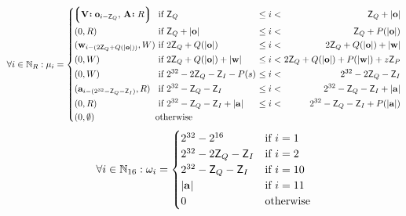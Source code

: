 \begin{equation}\label{eq:memlayout}
  \forall i \in \N_R : \mem_i = \left\{\begin{alignedat}{5}
    &\tup{\is{\mathbf{V}}{\mathbf{o}_{i - \mathsf{Z}_Q}}\ts\is{\mathbf{A}}{R}} &&\ \when
        \mathsf{Z}_Q
            &\ \leq i < \ &&
                \mathsf{Z}_Q + |\mathbf{o}|\\
    &(0, R) &&\ \when
        \mathsf{Z}_Q + |\mathbf{o}|
            &\ \leq i < \ &&
                \mathsf{Z}_Q + \rnp{|\mathbf{o}|} \\
    &(\mathbf{w}_{i - (2\mathsf{Z}_Q + \rnq{|\mathbf{o}|})}, W) &&\ \when
        2\mathsf{Z}_Q + \rnq{|\mathbf{o}|}
            &\ \leq i < \ &&
                2\mathsf{Z}_Q + \rnq{|\mathbf{o}|} + |\mathbf{w}|\\
    &(0, W) &&\ \when
        2\mathsf{Z}_Q + \rnq{|\mathbf{o}|} + |\mathbf{w}|
            &\ \leq i < \ &&
                2\mathsf{Z}_Q + \rnq{|\mathbf{o}|} + \rnp{|\mathbf{w}|} + z\mathsf{Z}_P\\
    &(0, W) &&\ \when
        2^{32} - 2\mathsf{Z}_Q - \mathsf{Z}_I - \rnp{s}
            &\ \leq i < \ &&
                2^{32} - 2\mathsf{Z}_Q - \mathsf{Z}_I\\
    &(\mathbf{a}_{i - (2^{32} - \mathsf{Z}_Q - \mathsf{Z}_I)}, R) &&\ \when
        2^{32} - \mathsf{Z}_Q - \mathsf{Z}_I
            &\ \leq i < \ &&
                2^{32} - \mathsf{Z}_Q - \mathsf{Z}_I + |\mathbf{a}|\\
    &(0, R) &&\ \when
        2^{32} - \mathsf{Z}_Q - \mathsf{Z}_I + |\mathbf{a}|
            &\ \leq i < \ &&
                2^{32} - \mathsf{Z}_Q - \mathsf{Z}_I + \rnp{|\mathbf{a}|}\\
    &(0, \none) &&\otherwise&&&
  \end{alignedat}\right.\\
\end{equation}
\begin{equation}
  \forall i \in \mathbb{N}_{16} : \omega_i = \begin{cases}
      2^{32} - 2^{16} &\text{if } i = 1\\
      2^{32} - 2\mathsf{Z}_Q - \mathsf{Z}_I &\text{if } i = 2\\
      2^{32} - \mathsf{Z}_Q - \mathsf{Z}_I &\text{if } i = 10\\
      |\mathbf{a}|&\text{if } i = 11\\
      0 &\text{otherwise}
    \end{cases}
\end{equation}

